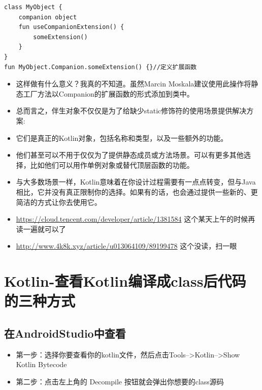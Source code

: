 \documentclass[9pt, b5paper]{article}
\begin{document}
\begin{verbatim}
class MyObject {
    companion object
    fun useCompanionExtension() {
        someExtension()
    }
}
fun MyObject.Companion.someExtension() {}//定义扩展函数
\end{verbatim}
\begin{itemize}
\item 这样做有什么意义？我真的不知道。虽然Marcin Moskala建议使用此操作将静态工厂方法以Companion的扩展函数的形式添加到类中。
\item 总而言之，伴生对象不仅仅是为了给缺少static修饰符的使用场景提供解决方案:
\item 它们是真正的Kotlin对象，包括名称和类型，以及一些额外的功能。
\item 他们甚至可以不用于仅仅为了提供静态成员或方法场景。可以有更多其他选择，比如他们可以用作单例对象或替代顶层函数的功能。
\item 与大多数场景一样，Kotlin意味着在你设计过程需要有一点点转变，但与Java相比，它并没有真正限制你的选择。如果有的话，也会通过提供一些新的、更简洁的方式让你去使用它。
\item \url{https://cloud.tencent.com/developer/article/1381584} 这个某天上午的时候再读一遍就可以了
\item \url{http://www.4k8k.xyz/article/u013064109/89199478} 这个没读，扫一眼
\end{itemize}

\section{Kotlin-查看Kotlin编译成class后代码的三种方式}
\label{sec-5}
\subsection{在AndroidStudio中查看}
\label{sec-5-1}
\begin{itemize}
\item 第一步：选择你要查看你的kotlin文件，然后点击Tools-->Kotlin-->Show Kotlin Bytecode
\item 第二步：点击左上角的 Decompile 按钮就会弹出你想要的class源码
\end{itemize}
\end{document}
